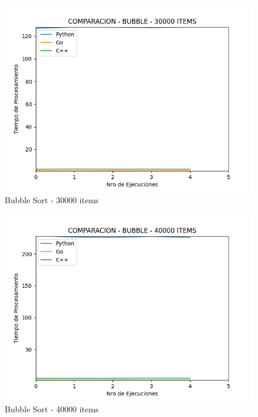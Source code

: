 \documentclass[12pt]{article} %
\begin{document}
    \begin{figure}[H]
    \centering
    \includegraphics[width=\textwidth]{bubble_30000}
    \caption{Bubble Sort - 30000 items}
    \end{figure}

    \vspace{5mm}
    
    \begin{figure}[H]
    \centering
    \includegraphics[width=\textwidth]{bubble_40000}
    \caption{Bubble Sort - 40000 items}
    \end{figure}

    \vspace{5mm}
    
\end{document}
